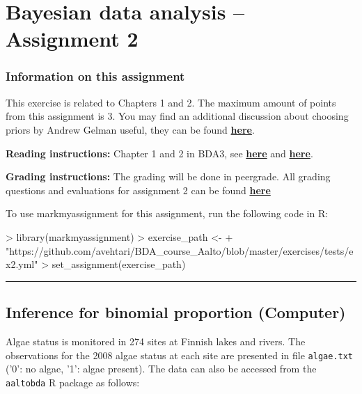 \documentclass[a4paper,11pt]{article}
\newcommand{\HRule}{\rule{\linewidth}{0.5mm}}
\begin{document}

\thispagestyle{empty}

\section*{Bayesian data analysis -- Assignment 2}




\subsubsection*{Information on this assignment}

This exercise is related to Chapters 1 and 2. The maximum amount of points from this assignment is 3. You may find an additional discussion about choosing priors by Andrew Gelman useful, they can be found \href{http://andrewgelman.com/2017/10/04/worry-rigged-priors/}{\textbf{here}}.

\textbf{Reading instructions:} Chapter 1 and 2 in BDA3, see \href{https://github.com/avehtari/BDA_course_Aalto/blob/master/chapter_notes/BDA_notes_ch1.pdf}{\textbf{here}} and \href{https://github.com/avehtari/BDA_course_Aalto/blob/master/chapter_notes/BDA_notes_ch2.pdf}{\textbf{here}}.

\textbf{Grading instructions:} The grading will be done in peergrade. All grading questions and evaluations for assignment 2 can be found \href{https://github.com/avehtari/BDA_course_Aalto/blob/master/exercises/ex1_rubric.md}{\textbf{here}}

To use markmyassignment for this assignment, run the following code in R:
\begin{Schunk}
\begin{Sinput}
> library(markmyassignment)
> exercise_path <- 
+   "https://github.com/avehtari/BDA_course_Aalto/blob/master/exercises/tests/ex2.yml"
> set_assignment(exercise_path)
\end{Sinput}
\end{Schunk}


\HRule

\newpage

\subsection*{Inference for binomial proportion (Computer)}

Algae status is monitored in 274 sites at Finnish lakes and rivers.
The observations for the 2008 algae status at each site are presented
in file {\tt algae.txt} ('0': no algae, '1': algae present). The data
can also be accessed from the {\tt aaltobda} R package as follows:
\end{document}
